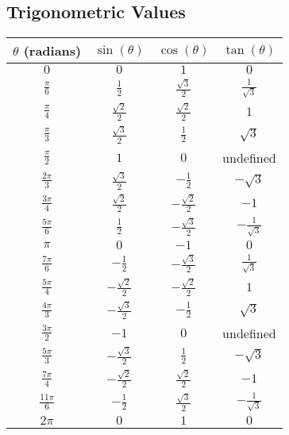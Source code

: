 \subsection{Trigonometric Values}
\smallskip
\begin{center}
    \renewcommand{\arraystretch}{1.4}
    \begin{tabular}{|c|c|c|c|}
    \hline
    \(\theta\) (radians) & \(\sin(\theta)\) & \(\cos(\theta)\) & \(\tan(\theta)\) \\
    \hline
    \(0\) & \(0\) & \(1\) & \(0\) \\
    \hline
    \(\frac{\pi}{6}\) & \(\frac{1}{2}\) & \(\frac{\sqrt{3}}{2}\) & \(\frac{1}{\sqrt{3}}\) \\
    \hline
    \(\frac{\pi}{4}\) & \(\frac{\sqrt{2}}{2}\) & \(\frac{\sqrt{2}}{2}\) & \(1\) \\
    \hline
    \(\frac{\pi}{3}\) & \(\frac{\sqrt{3}}{2}\) & \(\frac{1}{2}\) & \(\sqrt{3}\) \\
    \hline
    \(\frac{\pi}{2}\) & \(1\) & \(0\) & undefined \\
    \hline
    \(\frac{2\pi}{3}\) & \(\frac{\sqrt{3}}{2}\) & \(-\frac{1}{2}\) & \(-\sqrt{3}\) \\
    \hline
    \(\frac{3\pi}{4}\) & \(\frac{\sqrt{2}}{2}\) & \(-\frac{\sqrt{2}}{2}\) & \(-1\) \\
    \hline
    \(\frac{5\pi}{6}\) & \(\frac{1}{2}\) & \(-\frac{\sqrt{3}}{2}\) & \(-\frac{1}{\sqrt{3}}\) \\
    \hline
    \(\pi\) & \(0\) & \(-1\) & \(0\) \\
    \hline
    \(\frac{7\pi}{6}\) & \(-\frac{1}{2}\) & \(-\frac{\sqrt{3}}{2}\) & \(\frac{1}{\sqrt{3}}\) \\
    \hline
    \(\frac{5\pi}{4}\) & \(-\frac{\sqrt{2}}{2}\) & \(-\frac{\sqrt{2}}{2}\) & \(1\) \\
    \hline
    \(\frac{4\pi}{3}\) & \(-\frac{\sqrt{3}}{2}\) & \(-\frac{1}{2}\) & \(\sqrt{3}\) \\
    \hline
    \(\frac{3\pi}{2}\) & \(-1\) & \(0\) & undefined \\
    \hline
    \(\frac{5\pi}{3}\) & \(-\frac{\sqrt{3}}{2}\) & \(\frac{1}{2}\) & \(-\sqrt{3}\) \\
    \hline
    \(\frac{7\pi}{4}\) & \(-\frac{\sqrt{2}}{2}\) & \(\frac{\sqrt{2}}{2}\) & \(-1\) \\
    \hline
    \(\frac{11\pi}{6}\) & \(-\frac{1}{2}\) & \(\frac{\sqrt{3}}{2}\) & \(-\frac{1}{\sqrt{3}}\) \\
    \hline
    \(2\pi\) & \(0\) & \(1\) & \(0\) \\
    \hline
    \end{tabular}
\end{center}

